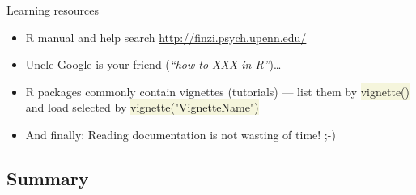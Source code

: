 \documentclass[compress, ucs, xelatex, 11pt, xcolor=svgnames, aspectratio=169,
	hyperref={
		bookmarks=true,
		unicode=true,
		colorlinks=true,
		pdftitle={Molecular data in R},
		plainpages=false,
		pdfauthor={Vojtech Zeisek},
		pdfsubject={Course about phylogeny and evolution in R},
		pdfcreator={XeLaTeX},
		pdfkeywords={R, evolution, phylogeny, molecular data},
		linkcolor=Crimson, %
		anchorcolor=Magenta, %
		citecolor=Magenta, %
		filecolor=Magenta, %
		menucolor=Magenta, %
		urlcolor=DodgerBlue, %
		pdftex},
	url={hyphens, lowtilde} %
	]{beamer}
\renewcommand{\texttt}[1]{\colorbox{Beige}{{\ttfamily #1}}}
\begin{document}
\begin{frame}[allowframebreaks]{Learning resources}
\begin{itemize}
		\item R manual and help search \url{http://finzi.psych.upenn.edu/}
		\item \href{http://rseek.org/}{Uncle Google} is your friend (\textit{\enquote{how to XXX in R}})\ldots
		\item R packages commonly contain vignettes (tutorials) --- list them by \texttt{vignette()} and load selected by \texttt{vignette("VignetteName")}
		\item And finally: \alert{Reading documentation is not wasting of time!} ;-)
	\end{itemize}
\end{frame}

\subsection{Summary}
\end{document}
